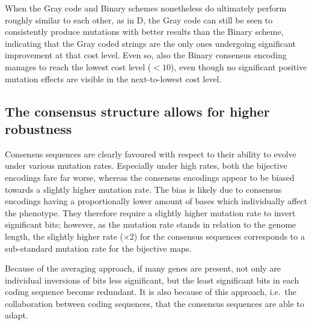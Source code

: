 \documentclass[a4paper,12pt]{article}
\theoremstyle{plain}
\theoremstyle{definition}
\begin{document}
      When the Gray code and Binary schemes
      nonetheless do ultimately perform roughly similar to each other, as in
      D, the Gray code can still be seen to
      consistently produce mutations with better results than the Binary scheme, 
      indicating that the Gray coded strings are the only ones undergoing significant
      improvement at that cost level. Even so, also the Binary consensus encoding
      manages to reach the lowest cost level ($< 10$), even though no
      significant positive mutation effects are visible in the next-to-lowest cost 
      level. 

   \subsection{The consensus structure allows for higher robustness}
      Consensus sequences are clearly favoured with respect to their
      ability to evolve under various mutation rates. Especially under high
      rates, both the bijective encodings fare far worse, whereas the
      consensus encodings appear to be biased towards a slightly higher mutation
      rate.  
      The bias is likely due to consensus encodings having a proportionally lower amount 
      of bases which individually affect the phenotype. They therefore
      require a slightly higher mutation rate to invert significant bits;
      however, as the mutation rate stands in relation to the genome length,
      the slightly higher rate ($\times$2) for the consensus sequences
      corresponds to a sub-standard mutation rate for the bijective maps. 

      Because of the averaging approach, if many genes are present,
      not only are individual inversions of bits less significant, but the least
      significant bits in each coding sequence become redundant. It is also
      because of this approach, i.e.\ the collaboration between coding
      sequences, that the consensus sequences are able to adapt.  
      

\end{document}
